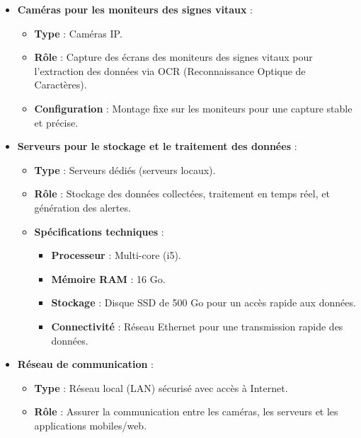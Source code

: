\begin{itemize}
    \item \textbf{Caméras pour les moniteurs des signes vitaux} :
    \begin{itemize}
        \item \textbf{Type} : Caméras IP.
        \item \textbf{Rôle} : Capture des écrans des moniteurs des signes vitaux pour l'extraction des données via OCR (Reconnaissance Optique de Caractères).
        \item \textbf{Configuration} : Montage fixe sur les moniteurs pour une capture stable et précise.
    \end{itemize}

    \item \textbf{Serveurs pour le stockage et le traitement des données} :
    \begin{itemize}
        \item \textbf{Type} : Serveurs dédiés (serveurs locaux).
        \item \textbf{Rôle} : Stockage des données collectées, traitement en temps réel, et génération des alertes.
        \item \textbf{Spécifications techniques} :
        \begin{itemize}
            \item \textbf{Processeur} : Multi-core (i5).
            \item \textbf{Mémoire RAM} : 16 Go.
            \item \textbf{Stockage} : Disque SSD de 500 Go pour un accès rapide aux données.
            \item \textbf{Connectivité} : Réseau Ethernet pour une transmission rapide des données.
        \end{itemize}
    \end{itemize}

    \item \textbf{Réseau de communication} :
    \begin{itemize}
        \item \textbf{Type} : Réseau local (LAN) sécurisé avec accès à Internet.
        \item \textbf{Rôle} : Assurer la communication entre les caméras, les serveurs et les applications mobiles/web.
    \end{itemize}


\end{itemize}
